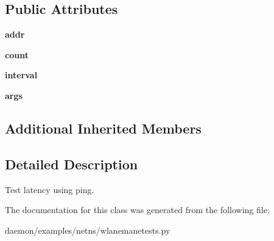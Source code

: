 \subsection*{Public Attributes}
\begin{DoxyCompactItemize}
\item 
\hypertarget{classwlanemanetests_1_1_ping_cmd_a088b8778b982e6c7aae18e871098760c}{{\bfseries addr}}\label{classwlanemanetests_1_1_ping_cmd_a088b8778b982e6c7aae18e871098760c}

\item 
\hypertarget{classwlanemanetests_1_1_ping_cmd_a0ff7a4ea2af5d46b51a5993e54105dee}{{\bfseries count}}\label{classwlanemanetests_1_1_ping_cmd_a0ff7a4ea2af5d46b51a5993e54105dee}

\item 
\hypertarget{classwlanemanetests_1_1_ping_cmd_acaeaa21a9c7014bf9f1238d6647901d1}{{\bfseries interval}}\label{classwlanemanetests_1_1_ping_cmd_acaeaa21a9c7014bf9f1238d6647901d1}

\item 
\hypertarget{classwlanemanetests_1_1_ping_cmd_ac9104e41ac8596407ba623c373fe18df}{{\bfseries args}}\label{classwlanemanetests_1_1_ping_cmd_ac9104e41ac8596407ba623c373fe18df}

\end{DoxyCompactItemize}
\subsection*{Additional Inherited Members}


\subsection{Detailed Description}
\begin{DoxyVerb}Test latency using ping.
\end{DoxyVerb}
 

The documentation for this class was generated from the following file\+:\begin{DoxyCompactItemize}
\item 
daemon/examples/netns/wlanemanetests.\+py\end{DoxyCompactItemize}
